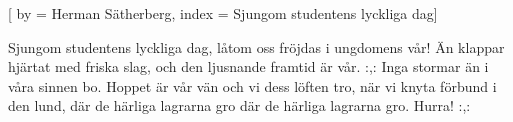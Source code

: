 

[ 
by = {Herman Sätherberg},
index = {Sjungom studentens lyckliga dag}]

\beginverse* 
Sjungom studentens lyckliga dag,
låtom oss fröjdas i ungdomens vår!
Än klappar hjärtat med friska slag,
och den ljusnande framtid är vår.
:,: Inga stormar än 
i våra sinnen bo.
Hoppet är vår vän 
och vi dess löften tro,
när vi knyta förbund i den lund,
där de härliga lagrarna gro
där de härliga lagrarna gro.
Hurra! :,: 
\endverse
\endsong


